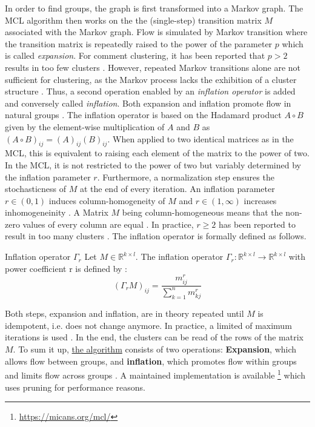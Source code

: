 In order to find groups, the graph is first transformed into a Markov graph. The MCL algorithm then works on the the (single-step) transition matrix $M$ associated with the Markov graph. Flow is simulated by Markov transition where the transition matrix is repeatedly raised to the power of the parameter $p$ which is called \textit{expansion}. For comment clustering, it has been reported that $p > 2$ results in too few clusters \cite{DBLP:conf/ecir/AkerKBPBHG16}. However, repeated Markov transitions alone are not sufficient for clustering, as the Markov process lacks the exhibition of a cluster structure \cite{vandongen00}. Thus, a second operation enabled by an \textit{inflation operator} is added and conversely called \textit{inflation}. Both expansion and inflation promote flow in natural groups \cite{vandongen00}. The inflation operator is based on the Hadamard product $A \circ B$ given by the element-wise multiplication of $A$ and $B$ as $(A \circ B)_{ij} = (A)_{ij} (B)_{ij}$. When applied to two identical matrices as in the MCL, this is equivalent to raising each element of the matrix to the power of two. In the MCL, it is not restricted to the power of two but variably determined by the inflation parameter $r$. Furthermore, a normalization step ensures the stochasticness of $M$ at the end of every iteration. An inflation parameter $r \in (0,1)$ induces column-homogeneity of $M$ and $r \in (1,\infty)$ increases inhomogeneinity \cite{vandongen00}. A Matrix $M$ being column-homogeneous means that the non-zero values of every column are equal \cite{vandongen00}. In practice, $r \geq 2$ has been reported to result in too many clusters \cite{DBLP:conf/ecir/AkerKBPBHG16}. The inflation operator is formally defined \cite{vandongen00} as follows.
\begin{definition}{Inflation operator $\Gamma_r$}
Let $M \in \mathbb{R}^{k \times l}$. The inflation operator $\Gamma_r : \mathbb{R}^{k \times l} \rightarrow \mathbb{R}^{k \times l}$ with power coefficient r is defined by \cite{vandongen00}:
\begin{equation}
(\Gamma_rM)_{ij} = \frac{m_{ij}^r}{\sum_{k=1}^n m_{kj}^r}
\end{equation}
\end{definition}
Both steps, expansion and inflation, are in theory repeated until $M$ is idempotent, i.e. does not change anymore. In practice, a limited of maximum iterations is used \cite{DBLP:conf/ecir/AkerKBPBHG16}. In the end, the clusters can be read of the rows of the matrix $M$.
To sum it up, \hyperref[mclalg]{the algorithm} consists of two operations: \textbf{Expansion}, which allows flow between groups, and \textbf{inflation}, which promotes flow within groups and limits flow across groups \cite{vandongen00, DBLP:conf/ecir/AkerKBPBHG16}. A maintained implementation is available \footnote{\url{https://micans.org/mcl/}} which uses pruning for performance reasons.

